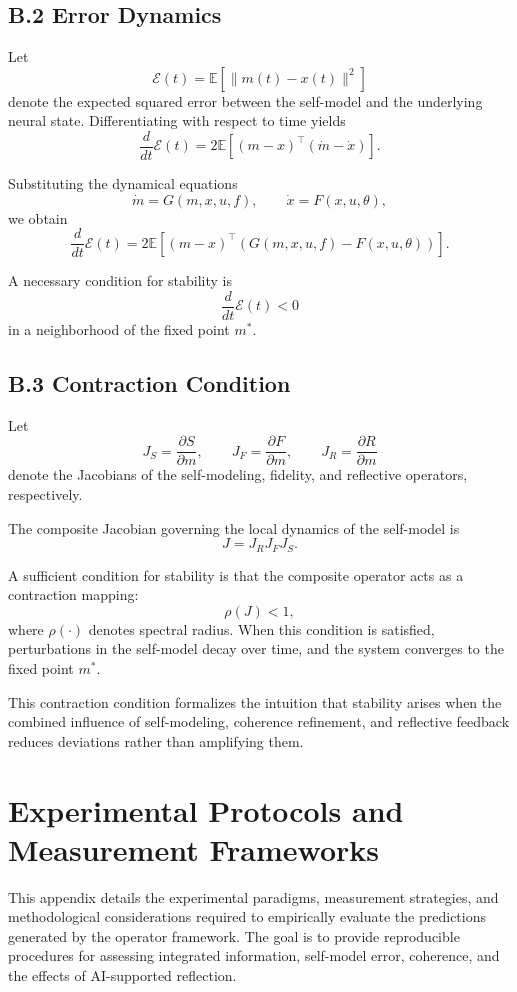 \documentclass[12pt]{article}
\begin{document}
\subsection*{B.2 Error Dynamics}

Let
\[
\mathcal{E}(t) = \mathbb{E}[\|m(t) - x(t)\|^2]
\]
denote the expected squared error between the self-model and the underlying neural state. Differentiating with respect to time yields
\[
\frac{d}{dt}\mathcal{E}(t)
= 2\mathbb{E}[(m - x)^\top(\dot{m} - \dot{x})].
\]

Substituting the dynamical equations
\[
\dot{m} = G(m, x, u, f), \qquad \dot{x} = F(x, u, \theta),
\]
we obtain
\[
\frac{d}{dt}\mathcal{E}(t)
= 2\mathbb{E}[(m - x)^\top(G(m, x, u, f) - F(x, u, \theta))].
\]

A necessary condition for stability is
\[
\frac{d}{dt}\mathcal{E}(t) < 0
\]
in a neighborhood of the fixed point $m^*$.

\subsection*{B.3 Contraction Condition}

Let
\[
J_S = \frac{\partial S}{\partial m}, \qquad
J_F = \frac{\partial F}{\partial m}, \qquad
J_R = \frac{\partial R}{\partial m}
\]
denote the Jacobians of the self-modeling, fidelity, and reflective operators, respectively.

The composite Jacobian governing the local dynamics of the self-model is
\[
J = J_R J_F J_S.
\]

A sufficient condition for stability is that the composite operator acts as a contraction mapping:
\[
\rho(J) < 1,
\]
where $\rho(\cdot)$ denotes spectral radius. When this condition is satisfied, perturbations in the self-model decay over time, and the system converges to the fixed point $m^*$.

This contraction condition formalizes the intuition that stability arises when the combined influence of self-modeling, coherence refinement, and reflective feedback reduces deviations rather than amplifying them.

\section{Experimental Protocols and Measurement Frameworks}

This appendix details the experimental paradigms, measurement strategies, and methodological considerations required to empirically evaluate the predictions generated by the operator framework. The goal is to provide reproducible procedures for assessing integrated information, self-model error, coherence, and the effects of AI-supported reflection.
\end{document}
